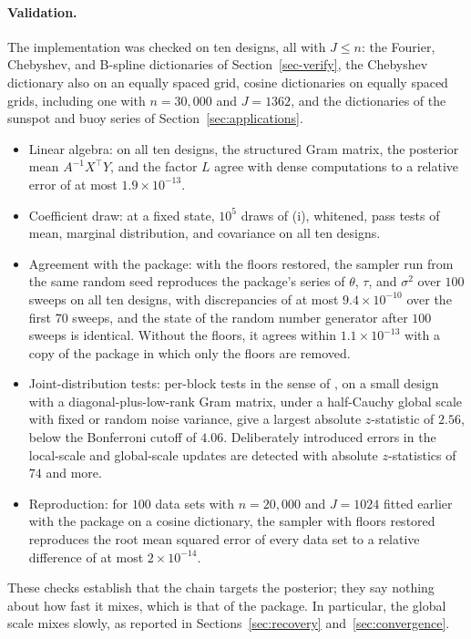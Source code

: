\paragraph*{Validation.} The implementation was checked on ten designs, all with $J\leq n$: the Fourier, Chebyshev, and B-spline dictionaries of Section~\ref{sec-verify}, the Chebyshev dictionary also on an equally spaced grid, cosine dictionaries on equally spaced grids, including one with $n=30{,}000$ and $J=1362$, and the dictionaries of the sunspot and buoy series of Section~\ref{sec:applications}.
\begin{itemize}
\item Linear algebra: on all ten designs, the structured Gram matrix, the posterior mean $A^{-1}X^\top Y$, and the factor $L$ agree with dense computations to a relative error of at most $1.9\times10^{-13}$.
\item Coefficient draw: at a fixed state, $10^5$ draws of (i), whitened, pass tests of mean, marginal distribution, and covariance on all ten designs.
\item Agreement with the package: with the floors restored, the sampler run from the same random seed reproduces the package's series of $\theta$, $\tau$, and $\sigma^2$ over $100$ sweeps on all ten designs, with discrepancies of at most $9.4\times10^{-10}$ over the first $70$ sweeps, and the state of the random number generator after $100$ sweeps is identical. Without the floors, it agrees within $1.1\times10^{-13}$ with a copy of the package in which only the floors are removed.
\item Joint-distribution tests: per-block tests in the sense of \citet{Geweke2004}, on a small design with a diagonal-plus-low-rank Gram matrix, under a half-Cauchy global scale with fixed or random noise variance, give a largest absolute $z$-statistic of $2.56$, below the Bonferroni cutoff of $4.06$. Deliberately introduced errors in the local-scale and global-scale updates are detected with absolute $z$-statistics of $74$ and more.
\item Reproduction: for $100$ data sets with $n=20{,}000$ and $J=1024$ fitted earlier with the package on a cosine dictionary, the sampler with floors restored reproduces the root mean squared error of every data set to a relative difference of at most $2\times10^{-14}$.
\end{itemize}
These checks establish that the chain targets the posterior; they say nothing about how fast it mixes, which is that of the package. In particular, the global scale mixes slowly, as reported in Sections~\ref{sec:recovery} and~\ref{sec:convergence}.

